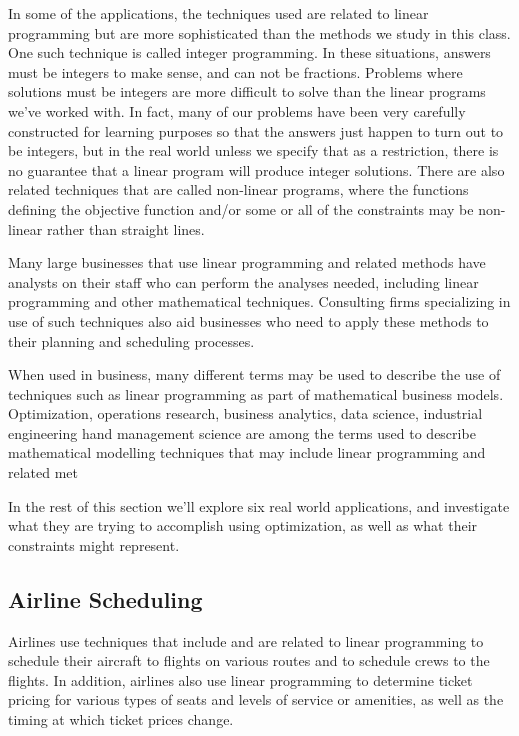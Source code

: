 In some of the applications, the techniques used are related to linear programming but are more sophisticated than the methods we study in this class.  One such technique is called integer programming.  In these situations, answers must be integers to make sense, and can not be fractions.  Problems where solutions must be integers are more difficult to solve than the linear programs we've worked with.  In fact, many of our problems have been very carefully constructed for learning purposes so that the answers just happen to turn out to be integers, but in the real world unless we specify that as a restriction, there is no guarantee that a linear program will produce integer solutions. There are also related techniques that are called non-linear programs, where the functions defining the objective function and/or some or all of the constraints may be non-linear rather than straight lines.

Many large businesses that use linear programming and related methods have analysts on their staff who can perform the analyses needed, including linear programming and other mathematical techniques. Consulting firms specializing in use of such techniques also aid businesses who need to apply these methods to their planning and scheduling processes.

When used in business, many different terms may be used to describe the use of techniques such as linear programming as part of mathematical business models.  Optimization, operations research, business analytics, data science, industrial engineering hand management science are among the terms used to describe mathematical modelling techniques that may include linear programming and related met

In the rest of this section we'll explore six real world applications, and investigate what they are trying to accomplish using optimization, as well as what their constraints might represent.

\subsection{Airline Scheduling}

Airlines use techniques that include and are related to linear programming to schedule their aircraft to flights on various routes and to schedule crews to the flights. In addition, airlines also use linear programming to determine ticket pricing for various types of seats and levels of service or amenities, as well as the timing at which ticket prices change.

